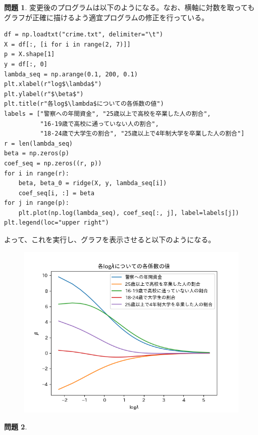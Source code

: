 \documentclass[titlepage]{jsarticle}
\theoremstyle{definition}
\newtheorem{Ex}{問題}
\theoremstyle{mystyle} %
\renewcommand{\footnotesize}{\normalsize}
\begin{document}
\begin{Ex}
変更後のプログラムは以下のようになる。なお、横軸に対数を取ってもグラフが正確に描けるよう適宜プログラムの修正を行っている。

\begin{lstlisting}[basicstyle = \ttfamily\footnotesize, frame = single]
df = np.loadtxt("crime.txt", delimiter="\t")
X = df[:, [i for i in range(2, 7)]]
p = X.shape[1]
y = df[:, 0]
lambda_seq = np.arange(0.1, 200, 0.1)
plt.xlabel(r"log$\lambda$")
plt.ylabel(r"$\beta$")
plt.title(r"各log$\lambda$についての各係数の値")
labels = ["警察への年間資金", "25歳以上で高校を卒業した人の割合",
          "16-19歳で高校に通っていない人の割合",
          "18-24歳で大学生の割合", "25歳以上で4年制大学を卒業した人の割合"]
r = len(lambda_seq)
beta = np.zeros(p)
coef_seq = np.zeros((r, p))
for i in range(r):
    beta, beta_0 = ridge(X, y, lambda_seq[i])
    coef_seq[i, :] = beta
for j in range(p):
    plt.plot(np.log(lambda_seq), coef_seq[:, j], label=labels[j])
plt.legend(loc="upper right")
\end{lstlisting}

よって、これを実行し、グラフを表示させると以下のようになる。

\begin{figure}[H]
\centering
\includegraphics[scale=0.7] {monndai14.png}
\end{figure}
\end{Ex}
\begin{Ex}

\end{Ex}
\end{document}
